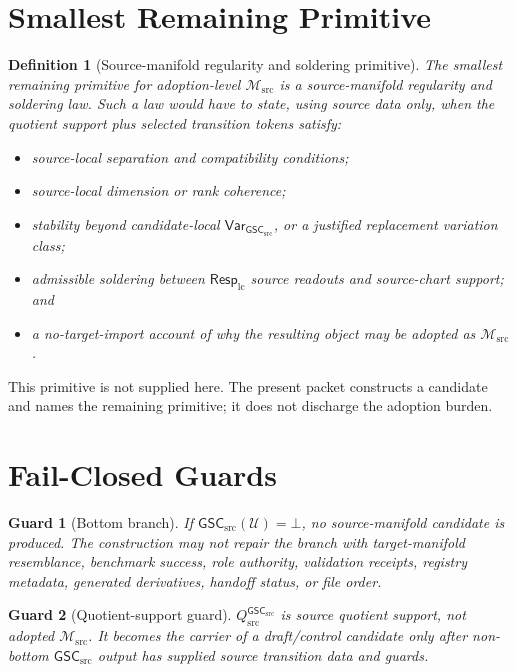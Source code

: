 \documentclass[11pt]{article}
\newcommand{\RespLC}{\mathsf{Resp}_{\mathrm{lc}}}
\newcommand{\Msrc}{\mathcal{M}_{\mathrm{src}}}
\newcommand{\GSC}{\mathsf{GSC}_{\mathrm{src}}}
\newcommand{\Vargsc}{\mathsf{Var}_{\GSC}}
\newcommand{\Qsrc}{Q_{\mathrm{src}}^{\GSC}}
\newcommand{\Bot}{\bot}
\newtheorem{definition}{Definition}
\newtheorem{guard}{Guard}
\begin{document}
\section{Smallest Remaining Primitive}

\begin{definition}[Source-manifold regularity and soldering primitive]
The smallest remaining primitive for adoption-level \(\Msrc\) is a
source-manifold regularity and soldering law. Such a law would have to state,
using source data only, when the quotient support plus selected transition
tokens satisfy:
\begin{itemize}
  \item source-local separation and compatibility conditions;
  \item source-local dimension or rank coherence;
  \item stability beyond candidate-local \(\Vargsc\), or a justified
  replacement variation class;
  \item admissible soldering between \(\RespLC\) source readouts and
  source-chart support; and
  \item a no-target-import account of why the resulting object may be adopted
  as \(\Msrc\).
\end{itemize}
\end{definition}

This primitive is not supplied here. The present packet constructs a
candidate and names the remaining primitive; it does not discharge the
adoption burden.

\section{Fail-Closed Guards}

\begin{guard}[Bottom branch]
If \(\GSC(\mathcal U)=\Bot\), no source-manifold candidate is produced.
The construction may not repair the branch with target-manifold resemblance,
benchmark success, role authority, validation receipts, registry metadata,
generated derivatives, handoff status, or file order.
\end{guard}

\begin{guard}[Quotient-support guard]
\(\Qsrc\) is source quotient support, not adopted \(\Msrc\). It becomes the
carrier of a draft/control candidate only after non-bottom \(\GSC\) output
has supplied source transition data and guards.
\end{guard}
\end{document}
